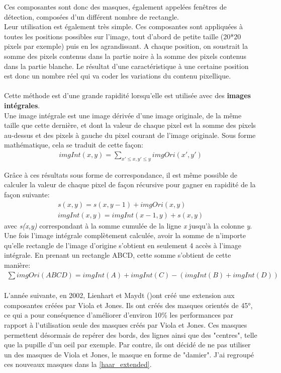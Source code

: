 \documentclass[poster]{polytech/polytech}
\begin{document}
Ces composantes sont donc des masques, également appelées fenêtres de détection, composées d'un différent nombre de rectangle.\\
Leur utilisation est également très simple. Ces composantes sont appliquées à toutes les positions possibles sur l'image, tout d'abord de petite taille (20*20 pixels par exemple) puis en les agrandissant. A chaque position, on soustrait la somme des pixels contenus dans la partie noire à la somme des pixels contenus dans la partie blanche. Le résultat d'une caractéristique à une certaine position est donc un nombre réel qui va coder les variations du contenu pixellique.\\
\\
Cette méthode est d'une grande rapidité lorsqu'elle est utilisée avec des \textbf{images intégrales}.\\
Une image intégrale est une image dérivée d'une image originale, de la même taille que cette dernière, et dont la valeur de chaque pixel est la somme des pixels au-dessus et des pixels à gauche du pixel courant de l'image originale. Sous forme mathématique, cela se traduit de cette façon:
\begin{align*}
imgInt(x,y)= \sum \nolimits_{x' \leq x , y' \leq y} imgOri(x',y')
\end{align*}

Grâce à ces résultats sous forme de correspondance, il est même possible de calculer la valeur de chaque pixel de façon récursive pour gagner en rapidité de la façon suivante:
\begin{align*}
s(x,y)=s(x,y-1)+imgOri(x,y)\\
imgInt(x,y)=imgInt(x-1,y)+s(x,y)
\end{align*}
avec \textit{s(x,y)} correspondant à la somme cumulée de la ligne \textit{x} jusqu'à la colonne \textit{y}. \\
Une fois l'image intégrale complètement calculée, avoir la somme de n'importe qu'elle rectangle de l'image d'origine s'obtient en seulement 4 accès à l'image intégrale. En prenant un rectangle ABCD, cette somme s'obtient de cette manière:
\begin{align*}
\sum imgOri(ABCD) = imgInt(A) + imgInt(C) - (imgInt(B) + imgInt(D))
\end{align*}
\\
L'année suivante, en 2002, Lienhart et Maydt (\cite{extended_haar})ont créé une extension aux composantes créées par Viola et Jones. Ils ont créés des masques orientés de 45°, ce qui a pour conséquence d'améliorer d'environ 10\% les performances par rapport à l'utilisation seule des masques créés par Viola et Jones. Ces masques permettent désormais de repérer des bords, des lignes ainsi que des "centres", telle que la pupille d'un oeil par exemple. Par contre, ils ont décidé de ne pas utiliser un des masques de Viola et Jones, le masque en forme de "damier". J'ai regroupé ces nouveaux masques dans la \autoref{haar_extended}.
\end{document}

